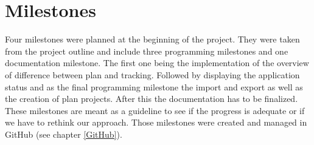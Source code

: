 \section{Milestones}
Four milestones were planned at the beginning of the project. They were taken from the project outline and include three programming milestones and one documentation milestone. The first one being the implementation of the overview of difference between plan and tracking. Followed by displaying the application status and as the final programming milestone the import and export as well as the creation of plan projects. After this the documentation has to be finalized. These milestones are meant as a guideline to see if the progress is adequate or if we have to rethink our approach. Those milestones were created and managed in GitHub (see chapter \ref{GitHub}). 